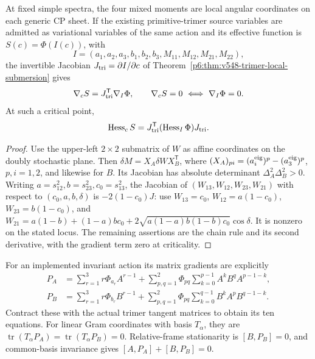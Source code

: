 \documentclass[12pt,a4paper]{article}
\begin{document}
\begin{proposition}
\label{p6:prop:v199-invariant-selection-equations}
At fixed simple spectra, the four mixed moments are local angular coordinates
on each generic CP sheet.  If the existing primitive-trimer source variables
are admitted as variational variables of the same action and its effective
function is \(S(c)=\Phi(I(c))\), with
\[
 I=(a_1,a_2,a_3,b_1,b_2,b_3,M_{11},M_{12},M_{21},M_{22}),
\]
the invertible Jacobian \(J_{\rm tri}=\partial I/\partial c\) of
Theorem~\ref{p6:thm:v548-trimer-local-submersion} gives
\begin{equation}
 \nabla_c S=J_{\rm tri}^{\mathsf T}\nabla_I\Phi,
 \qquad \nabla_cS=0\ \Longleftrightarrow\ \nabla_I\Phi=0.
 \label{p6:eq:v199-invariant-stationarity}
\end{equation}
At such a critical point,
\begin{equation}
 \operatorname{Hess}_c S
 =J_{\rm tri}^{\mathsf T}(\operatorname{Hess}_I\Phi)J_{\rm tri}.
 \label{p6:eq:v199-invariant-stability}
\end{equation}
\end{proposition}
\begin{proof}
Use the upper-left \(2\times2\) submatrix of \(W\) as affine coordinates
on the doubly stochastic plane.  Then
\(\delta M=X_A\delta W X_B^{\mathsf T}\), where
\((X_A)_{pi}=(a_i^{\rm eig})^p-(a_3^{\rm eig})^p\), \(p,i=1,2\),
and likewise for \(B\).  Its Jacobian has absolute determinant
\(\Delta_A^2\Delta_B^2>0\).
Writing \(a=s_{12}^2,b=s_{23}^2,c_0=s_{13}^2\), the Jacobian of
\((W_{13},W_{12},W_{23},W_{21})\) with respect to
\((c_0,a,b,\delta)\) is \(-2(1-c_0)J\): use
\(W_{13}=c_0\), \(W_{12}=a(1-c_0)\), \(W_{23}=b(1-c_0)\), and
\(W_{21}=a(1-b)+(1-a)bc_0+
2\sqrt{a(1-a)b(1-b)c_0}\cos\delta\).
It is nonzero on the stated locus.  The remaining assertions are the chain
rule and its second derivative, with the gradient term zero at criticality.
\end{proof}

For an implemented invariant action its matrix gradients are explicitly
\begin{align}
 P_A&=\sum_{r=1}^3r\Phi_{a_r}A^{r-1}
 +\sum_{p,q=1}^2\Phi_{pq}\sum_{k=0}^{p-1}A^kB^qA^{p-1-k},\nonumber\\
 P_B&=\sum_{r=1}^3r\Phi_{b_r}B^{r-1}
 +\sum_{p,q=1}^2\Phi_{pq}\sum_{k=0}^{q-1}B^kA^pB^{q-1-k}.
 \label{p6:eq:v199-matrix-gradients}
\end{align}
Contract these with the actual trimer tangent matrices to obtain its ten
equations.  For linear Gram coordinates with basis \(T_\alpha\), they are
\(\operatorname{tr}(T_\alpha P_A)=
\operatorname{tr}(T_\alpha P_B)=0\).
Relative-frame stationarity is \([B,P_B]=0\), and common-basis invariance
gives \([A,P_A]+[B,P_B]=0\).
\end{document}
